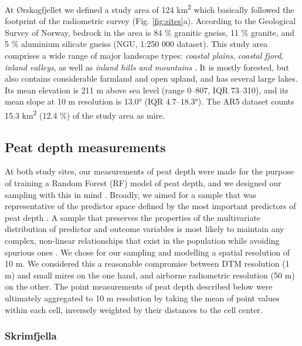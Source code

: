 \documentclass[soil, manuscript]{copernicus}
\begin{document}
At Ørskogfjellet we defined a study area of 124 km\textsuperscript{2} which basically followed the footprint of the radiometric survey (Fig. \ref{fig:sites}a).
According to the Geological Survey of Norway, bedrock in the area is 84 \% granitic gneiss, 11 \% granite, and 5 \% aluminium silicate gneiss (NGU, 1:250 000 dataset).
This study area comprises a wide range of major landscape types: \emph{coastal plains}, \emph{coastal fjord}, \emph{inland valleys}, as well as \emph{inland hills and mountains} \citep{simensenDiversityDistributionLandscape2021}.
It is mostly forested, but also contains considerable farmland and open upland, and has several large lakes.
Its mean elevation is 211 m above sea level (range 0--807, IQR 73--310), and its mean slope at 10 m resolution is 13.0° (IQR 4.7--18.3°).
The AR5 dataset counts 15.3 km\textsuperscript{2} (12.4 \%) of the study area as mire.

\subsection{Peat depth measurements}

At both study sites, our measurements of peat depth were made for the purpose of training a Random Forest (RF) model of peat depth, and we designed our sampling with this in mind \citep{brusSamplingDigitalSoil2019}.
Broadly, we aimed for a sample that was representative of the predictor space defined by the most important predictors of peat depth \citep{wadouxSamplingDesignOptimization2019, maComparisonConditionedLatin2020}.
A sample that preserves the properties of the multivariate distribution of predictor and outcome variables is most likely to maintain any complex, non-linear relationships that exist in the population while avoiding spurious ones \citep{brusSamplingDigitalSoil2019}.
We chose for our sampling and modelling a spatial resolution of 10 m.
We considered this a reasonable compromise between DTM resolution (1 m) and small mires on the one hand, and airborne radiometric resolution (50 m) on the other.
The point measurements of peat depth described below were ultimately aggregated to 10 m resolution by taking the mean of point values within each cell, inversely weighted by their distances to the cell center.

\subsubsection{Skrimfjella}
\end{document}
